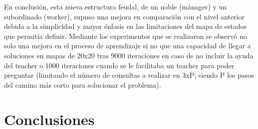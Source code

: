 \documentclass[letterpaper]{article} %
\begin{document}
En conclusión, esta nueva estructura feudal, de un noble (mánager) y un subordinado (worker), supuso una mejora en comparación con el nivel anterior debida a la simplicidad y mayor énfasis en las limitaciones del mapa de estados que permitía definir. Mediante los experimentos que se realizaron se observó no solo una mejora en el proceso de aprendizaje si no que una capacidad de llegar a soluciones en mapas de 20x20 tras 9000 iteraciones en caso de no incluir la ayuda del teacher o 1000 iteraciones cuando se le facilitaba un teacher para poder preguntar (limitando el número de consultas a realizar en 3xP; siendo P los pasos del camino más corto para solucionar el problema). 


\section{Conclusiones}






\end{document}
